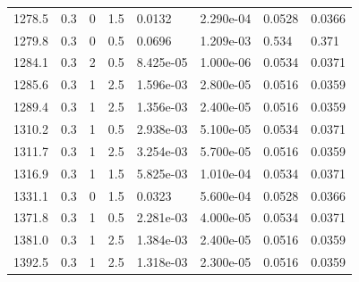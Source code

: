 \documentclass[preview]{standalone}
\begin{document}
{{{\begin{tabular}{L{1.2cm}C{1.2cm} C{0.3cm}C{0.5cm} C{1.4cm}C{1.4cm} C{1.4cm}C{1.4cm}}
  1278.5  &   0.3  & 0     & 1.5 &  0.0132  & 2.290e-04  & 0.0528 &  0.0366   \\ 
  1279.8  &   0.3  & 0     & 0.5 &  0.0696  & 1.209e-03  & 0.534 &  0.371   \\ 
  1284.1  &   0.3  & 2     & 0.5 &  8.425e-05  & 1.000e-06  & 0.0534 &  0.0371   \\ 
  1285.6  &   0.3  & 1     & 2.5 &  1.596e-03  & 2.800e-05  & 0.0516 &  0.0359   \\ 
  1289.4  &   0.3  & 1     & 2.5 &  1.356e-03  & 2.400e-05  & 0.0516 &  0.0359   \\ 
  1310.2  &   0.3  & 1     & 0.5 &  2.938e-03  & 5.100e-05  & 0.0534 &  0.0371   \\ 
  1311.7  &   0.3  & 1     & 2.5 &  3.254e-03  & 5.700e-05  & 0.0516 &  0.0359   \\ 
  1316.9  &   0.3  & 1     & 1.5 &  5.825e-03  & 1.010e-04  & 0.0534 &  0.0371   \\ 
  1331.1  &   0.3  & 0     & 1.5 &  0.0323  & 5.600e-04  & 0.0528 &  0.0366   \\ 
  1371.8  &   0.3  & 1     & 0.5 &  2.281e-03  & 4.000e-05  & 0.0534 &  0.0371   \\ 
  1381.0  &   0.3  & 1     & 2.5 &  1.384e-03  & 2.400e-05  & 0.0516 &  0.0359   \\ 
  1392.5  &   0.3  & 1     & 2.5 &  1.318e-03  & 2.300e-05  & 0.0516 &  0.0359   \\ 
\hline 
\end{tabular} 

}}}
\end{document}
